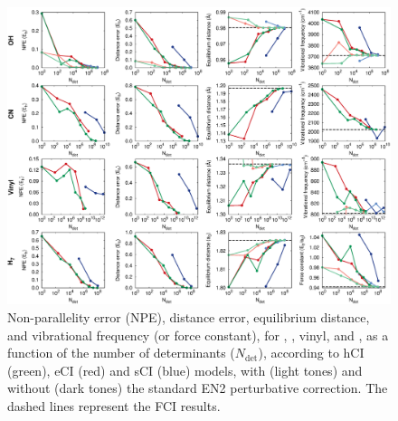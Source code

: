\documentclass[aip,jcp,reprint,noshowkeys,superscriptaddress]{revtex4-1}
\newcommand{\Ndet}{N_\text{det}}
\begin{document}
\begin{figure}%
\includegraphics[width=1.0\linewidth]{plot_all}
\caption{
Non-parallelity error (NPE), distance error, equilibrium distance, and vibrational frequency (or force constant), for , , vinyl, and ,
as a function of the number of determinants ($\Ndet$), according to hCI (green), eCI (red) and sCI (blue) models,
with (light tones) and without (dark tones) the standard EN2 perturbative correction.
The dashed lines represent the FCI results.}
\label{fig:plot_all}
\end{figure}
\end{document}
